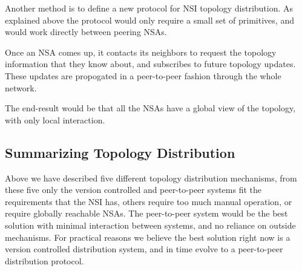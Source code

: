 \documentclass[12pt]{article}  %
\begin{document}
 Another method is to define a new protocol for NSI topology distribution. 
As explained above the protocol would only require a small set of primitives, and 
would work directly between peering NSAs.\label{h.jo1it2zr3py}


Once an NSA comes up, it contacts its neighbors to 
request the topology information that they know about, and subscribes to future 
topology updates. These updates are propogated in a peer-to-peer fashion through 
the whole network.\label{h.3qkmh8hazvti}


The end-result would be that all the NSAs have a 
global view of the topology, with only local interaction.\label{h.40nvr2if8zj}


\subsection{Summarizing Topology Distribution}

 Above we have described five different topology distribution mechanisms, 
from these five only the version controlled and peer-to-peer systems fit the requirements 
that the NSI has, others require too much manual operation, or require globally 
reachable NSAs. The peer-to-peer system would be the best solution with minimal 
interaction between systems, and no reliance on outside mechanisms. For practical 
reasons we believe the best solution right now is a version controlled distribution 
system, and in time evolve to a peer-to-peer distribution protocol.\label{h.j5x37xsutbrh}
\end{document}
